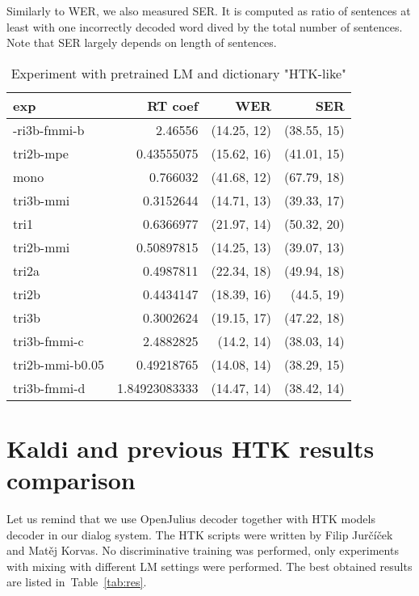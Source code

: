Similarly to \ac{WER}, we also measured \ac{SER}. It is computed as ratio of sentences at least with one incorrectly decoded word dived by the total number of sentences. Note that \ac{SER} largely depends on length of sentences. 

\begin{table}[!htp]\label{tab:htk_like}\centering\begin{tabular}{l|rrr}
exp             & RT coef       & WER         & SER        \\ 
\hline
-ri3b-fmmi-b    & 2.46556       & (14.25, 12) & (38.55, 15)\\ 
tri2b-mpe       & 0.43555075    & (15.62, 16) & (41.01, 15)\\ 
mono            & 0.766032      & (41.68, 12) & (67.79, 18)\\ 
tri3b-mmi       & 0.3152644     & (14.71, 13) & (39.33, 17)\\ 
tri1            & 0.6366977     & (21.97, 14) & (50.32, 20)\\ 
tri2b-mmi       & 0.50897815    & (14.25, 13) & (39.07, 13)\\ 
tri2a           & 0.4987811     & (22.34, 18) & (49.94, 18)\\ 
tri2b           & 0.4434147     & (18.39, 16) & (44.5, 19) \\ 
tri3b           & 0.3002624     & (19.15, 17) & (47.22, 18)\\ 
tri3b-fmmi-c    & 2.4882825     & (14.2, 14)  & (38.03, 14)\\ 
tri2b-mmi-b0.05 & 0.49218765    & (14.08, 14) & (38.29, 15)\\ 
tri3b-fmmi-d    & 1.84923083333 & (14.47, 14) & (38.42, 14)
\end{tabular}
\caption{Experiment with pretrained LM and dictionary "\ac{HTK}-like"}
\end{table}  


\section[Kaldi and \ac{HTK}]{Kaldi and previous \ac{HTK} results comparison} 
\label{sec:compare}

Let us remind that we use OpenJulius decoder together with HTK models decoder in our dialog system.
The \ac{HTK} scripts were written by Filip Jurčíček and Matěj Korvas. No discriminative training was performed,
only experiments with mixing with different \acl{LM} settings were performed. 
The best obtained results are listed in~Table~\ref{tab:res}.

